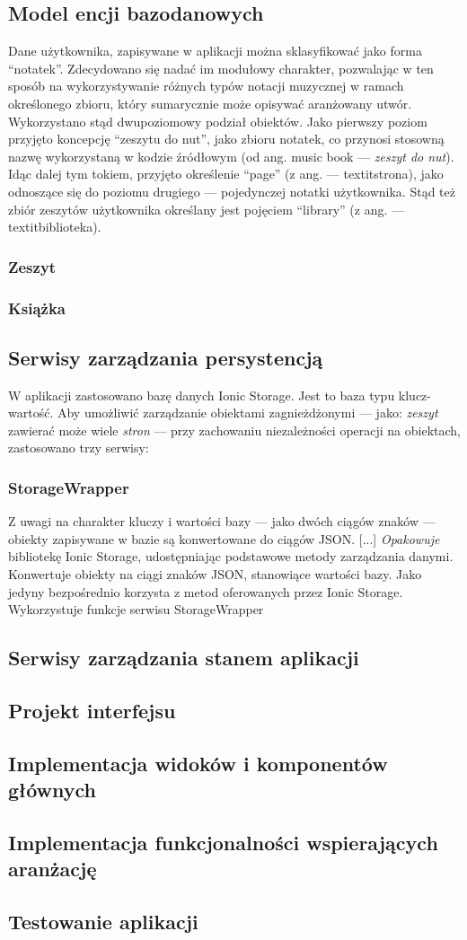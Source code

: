 \subsection{Model encji bazodanowych}
Dane użytkownika, zapisywane w aplikacji można sklasyfikować jako forma \enquote{notatek}.
Zdecydowano się nadać im modułowy charakter, pozwalając w ten sposób na wykorzystywanie różnych typów notacji muzycznej
w ramach określonego zbioru, który sumarycznie może opisywać aranżowany utwór.
Wykorzystano stąd dwupoziomowy podział obiektów. Jako pierwszy poziom przyjęto koncepcję
\enquote{zeszytu do nut}, jako zbioru notatek,
co przynosi stosowną nazwę wykorzystaną w kodzie źródłowym  (od ang.
music book — \textit{zeszyt do nut}).
Idąc dalej tym tokiem, przyjęto określenie \enquote{page} (z ang. — textit{strona}),
jako odnoszące się do poziomu drugiego — pojedynczej notatki użytkownika.
Stąd też zbiór zeszytów użytkownika określany jest pojęciem \enquote{library} (z ang. — textit{biblioteka}).
\subsubsection{Zeszyt}
\subsubsection{Książka}
\subsection{Serwisy zarządzania persystencją}
W aplikacji zastosowano bazę danych Ionic Storage. Jest to baza typu klucz-wartość. Aby umożliwić
zarządzanie obiektami zagnieżdżonymi — jako: \textit{zeszyt} zawierać może wiele \textit{stron} — przy zachowaniu
niezależności operacji na obiektach, zastosowano trzy serwisy:
\subsubsection{StorageWrapper}
Z uwagi na charakter kluczy i wartości bazy — jako dwóch ciągów znaków — obiekty zapisywane w bazie są
konwertowane do ciągów JSON. [...]
\textit{Opakowuje} bibliotekę Ionic Storage, udostępniając podstawowe metody zarządzania danymi. Konwertuje
obiekty na ciągi znaków JSON, stanowiące wartości bazy. Jako jedyny bezpośrednio korzysta z metod oferowanych
przez Ionic Storage.
Wykorzystuje funkcje serwisu StorageWrapper

\subsection{Serwisy zarządzania stanem aplikacji}
\subsection{Projekt interfejsu}
\subsection{Implementacja widoków i komponentów głównych}
\subsection{Implementacja funkcjonalności wspierających aranżację}
\subsection{Testowanie aplikacji}

